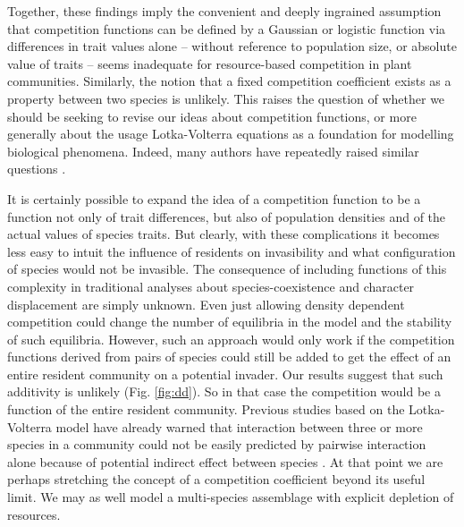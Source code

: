 \documentclass[a4paper,11pt]{article}
\begin{document}
Together, these findings imply the convenient and deeply ingrained assumption that competition functions can be defined by  a Gaussian or logistic function via differences in trait values alone -- without reference to population size, or absolute value of traits -- seems inadequate for resource-based competition in plant communities.
%
Similarly, the notion that a fixed competition coefficient exists as a property between two species is unlikely. This raises the question of whether we should be seeking to revise our ideas about competition functions, or more generally about the usage Lotka-Volterra equations as a foundation for modelling biological phenomena.
Indeed, many authors have repeatedly raised similar questions \citep[e.g.][]{Andrewartha-1953,
  Neill-1974, Abrams-1975, Wangersky-1978,Abrams-1980, Tilman-1987,
  Abrams-2008}.

It is certainly possible to expand the idea of a competition function to be a function not only of trait differences, but also of population densities and of the actual values of species traits. But clearly, with these complications it becomes less easy to intuit the influence of residents on invasibility and what configuration of species would not be invasible. The consequence of including functions of this complexity in traditional analyses about species-coexistence and character displacement are simply unknown.
Even just allowing density dependent competition could change the number of equilibria in the model and the stability of such equilibria.
%
However, such an approach would only work if the competition functions derived from pairs of species could still be added to get the effect of an entire resident community on a potential invader.
%
Our results suggest that such additivity is unlikely
(Fig. \ref{fig:dd}). %
 So in that case the competition would be a function of the entire resident community. Previous studies based on the Lotka-Volterra model have already warned that interaction between three or more species in a community could not be easily predicted by pairwise interaction alone because of potential indirect effect between species \citep{Levine-1976}.
 At that point we are perhaps stretching the concept of a competition coefficient beyond its useful limit. We may as well model a multi-species assemblage with explicit depletion of resources.
\end{document}
